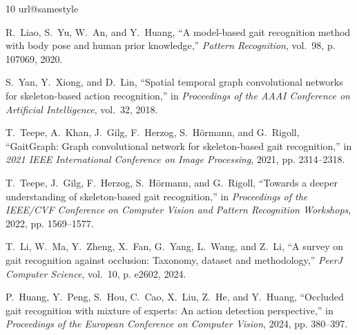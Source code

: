 \documentclass[journal]{IEEEtran}
\begin{document}
\begin{thebibliography}{10}
\providecommand{\url}[1]{#1}
\csname url@samestyle\endcsname
\providecommand{\newblock}{\relax}
\providecommand{\bibinfo}[2]{#2}
\providecommand{\BIBentrySTDinterwordspacing}{\spaceskip=0pt\relax}
\providecommand{\BIBentryALTinterwordstretchfactor}{4}
\providecommand{\BIBentryALTinterwordspacing}{\spaceskip=\fontdimen2\font plus
\BIBentryALTinterwordstretchfactor\fontdimen3\font minus
  \fontdimen4\font\relax}
\providecommand{\BIBforeignlanguage}[2]{{%
\expandafter\ifx\csname l@#1\endcsname\relax
\typeout{** WARNING: IEEEtran.bst: No hyphenation pattern has been}%
\typeout{** loaded for the language `#1'. Using the pattern for}%
\typeout{** the default language instead.}%
\else
\language=\csname l@#1\endcsname
\fi
#2}}
\providecommand{\BIBdecl}{\relax}
\BIBdecl

R.~Liao, S.~Yu, W.~An, and Y.~Huang, ``A model-based gait recognition method
  with body pose and human prior knowledge,'' \emph{{Pattern Recognition}},
  vol.~98, p. 107069, 2020.

S.~Yan, Y.~Xiong, and D.~Lin, ``Spatial temporal graph convolutional networks
  for skeleton-based action recognition,'' in \emph{{Proceedings of the AAAI
  Conference on Artificial Intelligence}}, vol.~32, 2018.

T.~Teepe, A.~Khan, J.~Gilg, F.~Herzog, S.~H{\"o}rmann, and G.~Rigoll,
  ``{GaitGraph}: Graph convolutional network for skeleton-based gait
  recognition,'' in \emph{{2021 IEEE International Conference on Image
  Processing}}, 2021, pp. 2314--2318.

T.~Teepe, J.~Gilg, F.~Herzog, S.~H{\"o}rmann, and G.~Rigoll, ``Towards a deeper
  understanding of skeleton-based gait recognition,'' in \emph{{Proceedings of
  the IEEE/CVF Conference on Computer Vision and Pattern Recognition
  Workshops}}, 2022, pp. 1569--1577.

T.~Li, W.~Ma, Y.~Zheng, X.~Fan, G.~Yang, L.~Wang, and Z.~Li, ``A survey on gait
  recognition against occlusion: Taxonomy, dataset and methodology,''
  \emph{{PeerJ Computer Science}}, vol.~10, p. e2602, 2024.

P.~Huang, Y.~Peng, S.~Hou, C.~Cao, X.~Liu, Z.~He, and Y.~Huang, ``Occluded gait
  recognition with mixture of experts: An action detection perspective,'' in
  \emph{{Proceedings of the European Conference on Computer Vision}}, 2024, pp.
  380--397.


\end{thebibliography}
\end{document}
